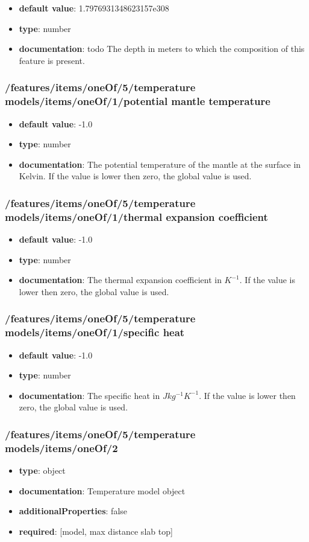 \begin{itemize}\item {\bf default value}: 1.7976931348623157e308
\item {\bf type}: number
\item {\bf documentation}: todo The depth in meters to which the composition of this feature is present.
\end{itemize}\subsubsection{/features/items/oneOf/5/temperature models/items/oneOf/1/potential mantle temperature}
\begin{itemize}\item {\bf default value}: -1.0
\item {\bf type}: number
\item {\bf documentation}: The potential temperature of the mantle at the surface in Kelvin. If the value is lower then zero, the global value is used.
\end{itemize}\subsubsection{/features/items/oneOf/5/temperature models/items/oneOf/1/thermal expansion coefficient}
\begin{itemize}\item {\bf default value}: -1.0
\item {\bf type}: number
\item {\bf documentation}: The thermal expansion coefficient in $K^{-1}$. If the value is lower then zero, the global value is used.
\end{itemize}\subsubsection{/features/items/oneOf/5/temperature models/items/oneOf/1/specific heat}
\begin{itemize}\item {\bf default value}: -1.0
\item {\bf type}: number
\item {\bf documentation}: The specific heat in $J kg^{-1} K^{-1}$. If the value is lower then zero, the global value is used.
\end{itemize}\subsubsection{/features/items/oneOf/5/temperature models/items/oneOf/2}
\begin{itemize}\item {\bf type}: object
\item {\bf documentation}: Temperature model object
\item {\bf additionalProperties}: false
\item {\bf required}: [model, max distance slab top]\end{itemize}
